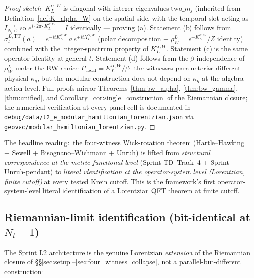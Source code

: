 \documentclass[11pt,a4paper]{article}
\theoremstyle{plain}
\theoremstyle{definition}
\begin{document}
\begin{proof}[Proof sketch]
$K_L^{\alpha, W}$ is diagonal with integer eigenvalues
$\mathrm{two}\_m_j$ (inherited from Definition~\ref{def:K_alpha_W} on
the spatial side, with the temporal slot acting as $I_{N_t}$),
so $e^{i \cdot 2\pi \cdot K_L^{\alpha, W}} = I$ identically — proving
(a).  Statement (b) follows from
$\sigma_t^{L, \mathrm{TT}}(a) = e^{-i t K_L^{\alpha, W}} \, a \, e^{+i t K_L^{\alpha, W}}$
(polar decomposition + $\rho_W^L = e^{-K_L^{\alpha, W}}/Z$ identity)
combined with the integer-spectrum property of $K_L^{\alpha, W}$.
Statement (c) is the same operator identity at general $t$.  Statement
(d) follows from the $\beta$-independence of $\rho_W^L$ under the BW
choice $H_{\mathrm{local}} = K_L^{\alpha, W}/\beta$:\ the witnesses
parameterise different physical $\kappa_g$, but the modular
construction does not depend on $\kappa_g$ at the algebra-action
level.  Full proofs mirror Theorems~\ref{thm:bw_alpha},
\ref{thm:bw_gamma}, \ref{thm:unified}, and
Corollary~\ref{cor:single_construction} of the Riemannian closure;
the numerical verification at every panel cell is documented in
\texttt{debug/data/l2\_e\_modular\_hamiltonian\_lorentzian.json} via
\texttt{geovac/modular\_hamiltonian\_lorentzian.py}.
\end{proof}

The headline reading:\ the four-witness Wick-rotation theorem
(Hartle--Hawking + Sewell + Bisognano--Wichmann + Unruh) is lifted
from \emph{structural correspondence at the metric-functional level}
(Sprint TD~Track~4 + Sprint Unruh-pendant) to \emph{literal
identification at the operator-system level (Lorentzian, finite
cutoff)} at every tested Krein cutoff.  This is the framework's
first operator-system-level literal identification of a Lorentzian
QFT theorem at finite cutoff.

\subsection{Riemannian-limit identification (bit-identical at $N_t = 1$)}
\label{sec:riemannian_limit_identification}

The Sprint L2 architecture is the genuine Lorentzian \emph{extension}
of the Riemannian closure of \S\S\ref{sec:setup}--\ref{sec:four_witness_collapse},
not a parallel-but-different construction:
\end{document}
